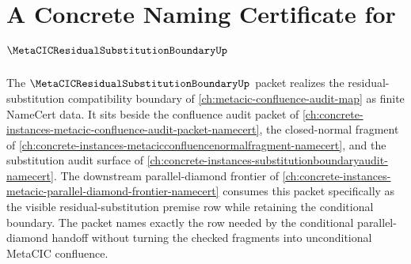 \chapter{A Concrete Naming Certificate for $\MetaCICResidualSubstitutionBoundaryUp$}
\label{ch:concrete-instances-metacic-residual-substitution-boundary-namecert}

The $\MetaCICResidualSubstitutionBoundaryUp$ packet realizes the residual-substitution compatibility boundary of \autoref{ch:metacic-confluence-audit-map} as finite NameCert data. It sits beside the confluence audit packet of \autoref{ch:concrete-instances-metacic-confluence-audit-packet-namecert}, the closed-normal fragment of \autoref{ch:concrete-instances-metacicconfluencenormalfragment-namecert}, and the substitution audit surface of \autoref{ch:concrete-instances-substitutionboundaryaudit-namecert}. The downstream parallel-diamond frontier of \autoref{ch:concrete-instances-metacic-parallel-diamond-frontier-namecert} consumes this packet specifically as the visible residual-substitution premise row while retaining the conditional boundary. The packet names exactly the row needed by the conditional parallel-diamond handoff without turning the checked fragments into unconditional MetaCIC confluence.

